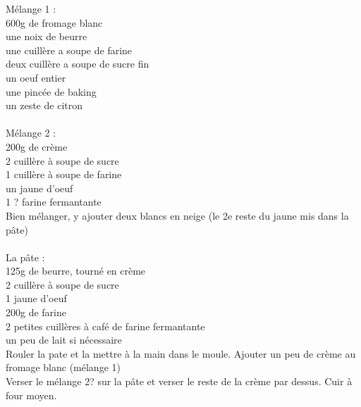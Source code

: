 \begin{minipage}[c]{\textwidth}
Mélange 1 :\\
    600g de fromage blanc\\
    une noix de beurre\\
    une cuillère a soupe de farine\\
    deux cuillère a soupe de sucre fin\\
    un oeuf entier\\
    une pincée de baking\\
    un zeste de citron \\
\\
Mélange 2 :\\
    200g de crème\\
    2 cuillère à soupe de sucre\\
    1 cuillère à soupe de farine\\
    un jaune d'oeuf\\
    1 ? farine fermantante\\
    Bien mélanger, y ajouter deux blancs en neige (le 2e reste du jaune mis dans la pâte)\\
\\
La pâte :\\
    125g de beurre, tourné en crème\\
    2 cuillère à soupe de sucre\\
    1 jaune d'oeuf\\
    200g de farine\\
    2 petites cuillères à café de farine fermantante\\
    un peu de lait si nécessaire\\
Rouler la pate et la mettre à la main dans le moule. Ajouter un peu de crème au fromage blanc (mélange 1)\\
Verser le mélange 2? sur la pâte et verser le reste de la crème par dessus. Cuir à four moyen.\\
\\

\end{minipage}

